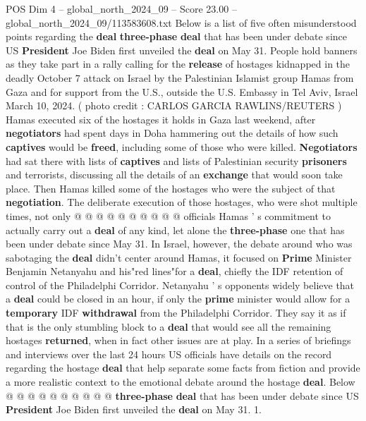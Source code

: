 \begin{textsample}{POS Dim 4 – global\_north\_2024\_09 – Score 23.00 – global\_north\_2024\_09/113583608.txt}  \label{ex:f4_pos_321}
Below is a list of five often misunderstood points regarding the \textbf{deal} \textbf{three-phase} \textbf{deal} that has been under debate since US \textbf{President} Joe Biden first unveiled the \textbf{deal} on May 31.
People hold banners as they take part in a rally calling for the \textbf{release} of hostages kidnapped in the deadly October 7 attack on Israel by the Palestinian Islamist group Hamas from Gaza and for support from the U.S., outside the U.S.
Embassy in Tel Aviv, Israel March 10, 2024. ( photo credit : CARLOS GARCIA RAWLINS/REUTERS ) Hamas executed six of the hostages it holds in Gaza last weekend, after \textbf{negotiators} had spent days in Doha hammering out the details of how such \textbf{captives} would be \textbf{freed}, including some of those who were killed. \textbf{Negotiators} had sat there with lists of \textbf{captives} and lists of Palestinian security \textbf{prisoners} and terrorists, discussing all the details of an \textbf{exchange} that would soon take place.
Then Hamas killed some of the hostages who were the subject of that \textbf{negotiation}.
The deliberate execution of those hostages, who were shot multiple times, not only @ @ @ @ @ @ @ @ @ @ officials Hamas ' s commitment to actually carry out a \textbf{deal} of any kind, let alone the \textbf{three-phase} one that has been under debate since May 31.
In Israel, however, the debate around who was sabotaging the \textbf{deal} didn't center around Hamas, it focused on \textbf{Prime} Minister Benjamin Netanyahu and his"red lines"for a \textbf{deal}, chiefly the IDF retention of control of the Philadelphi Corridor.
Netanyahu ' s opponents widely believe that a \textbf{deal} could be closed in an hour, if only the \textbf{prime} minister would allow for a \textbf{temporary} IDF \textbf{withdrawal} from the Philadelphi Corridor.
They say it as if that is the only stumbling block to a \textbf{deal} that would see all the remaining hostages \textbf{returned}, when in fact other issues are at play.
In a series of briefings and interviews over the last 24 hours US officials have details on the record regarding the hostage \textbf{deal} that help separate some facts from fiction and provide a more realistic context to the emotional debate around the hostage \textbf{deal}.
Below @ @ @ @ @ @ @ @ @ @ \textbf{three-phase} \textbf{deal} that has been under debate since US \textbf{President} Joe Biden first unveiled the \textbf{deal} on May 31. 1.

\end{textsample}
